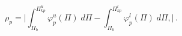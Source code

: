 \begin{equation}
\rho_{p}=\Biggr|\int_{\Pi_{b}}^{\Pi^{u}_{kp}} \varphi^{u}_{p}(\Pi)
\; d\Pi -\int_{\Pi_{b}}^{\Pi^{l}_{kp}} \varphi^{l}_{p}(\Pi) \;
d\Pi,\Biggr| \, .
\end{equation}

